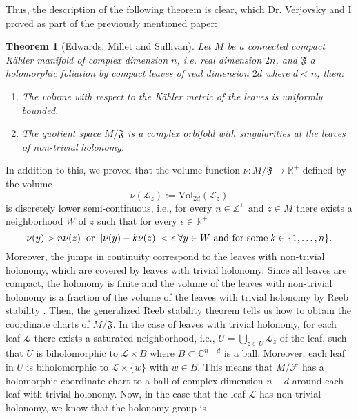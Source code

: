\documentclass[12pt,twoside,a4paper]{report}
\newtheorem{theorem}{Theorem}[section]
\newcommand{\zah}{\ensuremath{ \mathbb Z }}
\newcommand{\co}{\ensuremath{\mathbb C }}
\newcommand{\re}{\ensuremath{\mathbb R }}
\begin{document}
\noindent Thus, the description of the following theorem is clear, which Dr. Verjovsky and I proved as part of the previously mentioned paper:
\begin{theorem}[Edwards, Millet and Sullivan]\label{EMS}
        Let $M$ be a connected compact K\"ahler manifold of complex dimension $n$, i.e. real dimension $2n$, and $\mathfrak{F}$ a holomorphic foliation by compact
        leaves of real dimension $2d$ where $d<n$, then:
        \begin{enumerate}
                \item[a)] The volume with respect to the K\"ahler metric of the leaves is uniformly bounded.
                \item[b)] The quotient space $M/\mathfrak{F}$ is a complex orbifold with singularities at the leaves of non-trivial holonomy.
        \end{enumerate}
\end{theorem}
In addition to this, we proved that the volume function $\nu:M/\mathfrak{F}\rightarrow\re^{+}$ defined by the volume
\[
        \nu(\mathcal{L}_z):=\textrm{Vol}_{2d}(\mathcal{L}_z)
\]
is discretely lower semi-continuous, i.e., for every $n\in\zah^{+}$ and $z\in M$ there exists a neighborhood $W$ of $z$
such that for every $\epsilon\in\re^{+}$
\[
        \nu(y)>n\nu(z)\hspace{0.2cm}\text{or}\hspace{0.2cm}|\nu(y)-k\nu(z)|<\epsilon\hspace{0.1cm}\forall y\in W\text{ and for some}\hspace{0.1cm}k\in\{1,\dots,n\}.
\]
\noindent Moreover, the jumps in continuity correspond to the leaves with non-trivial holonomy, which are covered
by leaves with trivial holonomy. Since all leaves are compact, the holonomy is finite and the volume of the leaves
with non-trivial holonomy is a fraction of the volume of the leaves with trivial holonomy by Reeb stability \cite{Thurston}.
Then, the generalized Reeb stability theorem \cite{Thurston} tells us how to obtain the coordinate charts of $M/\mathfrak{F}$.
In the case of leaves with trivial holonomy, for each leaf $\mathcal{L}$ there exists a saturated neighborhood, i.e., $U=\bigcup_{z\in U}\mathcal{L}_z$ of the leaf,
such that $U$ is biholomorphic to $\mathcal{L}\times B$ where $B\subset\co^{n-d}$ is a ball. Moreover, each leaf in $U$ is biholomorphic to $\mathcal{L}\times\{w\}$ with $w\in B$.
This means that $M/\mathcal{F}$ has a holomorphic coordinate chart to a ball of complex dimension $n-d$ around each leaf
with trivial holonomy. Now, in the case that the leaf $\mathcal{L}$ has non-trivial holonomy, we know that the holonomy group is
\end{document}
